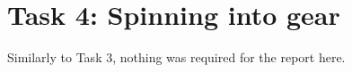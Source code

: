 \section{Task 4: Spinning into gear}
Similarly to Task 3, nothing was required for the report here. 